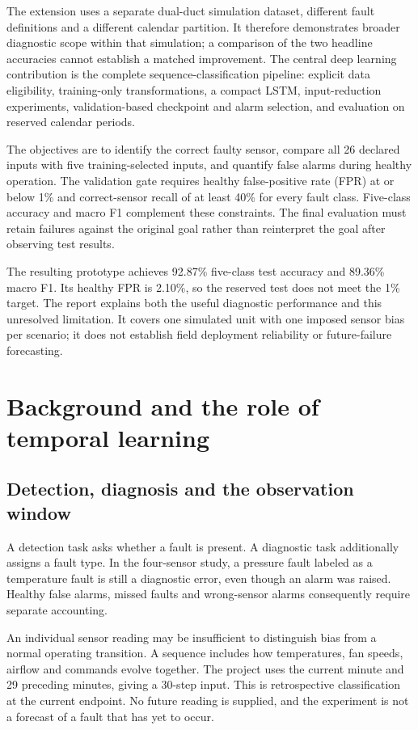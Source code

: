 The extension uses a separate dual-duct simulation dataset, different fault definitions and a different calendar partition. It therefore demonstrates broader diagnostic scope within that simulation; a comparison of the two headline accuracies cannot establish a matched improvement. The central deep learning contribution is the complete sequence-classification pipeline: explicit data eligibility, training-only transformations, a compact LSTM, input-reduction experiments, validation-based checkpoint and alarm selection, and evaluation on reserved calendar periods.

The objectives are to identify the correct faulty sensor, compare all 26 declared inputs with five training-selected inputs, and quantify false alarms during healthy operation. The validation gate requires healthy false-positive rate (FPR) at or below 1\% and correct-sensor recall of at least 40\% for every fault class. Five-class accuracy and macro F1 complement these constraints. The final evaluation must retain failures against the original goal rather than reinterpret the goal after observing test results.

The resulting prototype achieves 92.87\% five-class test accuracy and 89.36\% macro F1. Its healthy FPR is 2.10\%, so the reserved test does not meet the 1\% target. The report explains both the useful diagnostic performance and this unresolved limitation. It covers one simulated unit with one imposed sensor bias per scenario; it does not establish field deployment reliability or future-failure forecasting.

\section{Background and the role of temporal learning}
\subsection{Detection, diagnosis and the observation window}
A detection task asks whether a fault is present. A diagnostic task additionally assigns a fault type. In the four-sensor study, a pressure fault labeled as a temperature fault is still a diagnostic error, even though an alarm was raised. Healthy false alarms, missed faults and wrong-sensor alarms consequently require separate accounting.

An individual sensor reading may be insufficient to distinguish bias from a normal operating transition. A sequence includes how temperatures, fan speeds, airflow and commands evolve together. The project uses the current minute and 29 preceding minutes, giving a 30-step input. This is retrospective classification at the current endpoint. No future reading is supplied, and the experiment is not a forecast of a fault that has yet to occur.

